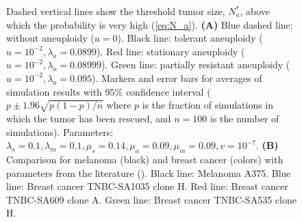 \documentclass[12pt]{extarticle}
\begin{document}
\begin{figure}
{Dashed vertical lines show the threshold tumor size, $N_a^*$, above which the probability is very high (\cref{eq:N_a}). 
\textbf{(A)} Blue dashed line: without aneuploidy ($u=0$). Black line: tolerant aneuploidy ($u=10^{-2}, \lambda_a=0.0899$). Red line: stationary aneuploidy ($u=10^{-2}, \lambda_a=0.08999$). Green line: partially resistant aneuploidy ($u=10^{-2}, \lambda_a=0.095$). Markers and error bars for averages of simulation results with $95\%$ confidence interval ($p\pm1.96\sqrt{p\left(1-p\right)/n}$ where $p$ is the fraction of simulations in which the tumor has been rescued, and $n=100$ is the number of simulations). Parameters: $\lambda_s=0.1,\lambda_m=0.1,\mu_s=0.14,\mu_a=0.09,\mu_m=0.09, v=10^{-7}$.
\textbf{(B)} Comparison for melanoma (black) and breast cancer (colors)  with parameters from the literature (). Black line: Melanoma A375. Blue line: Breast cancer TNBC-SA1035 clone H. Red line: Breast cancer TNBC-SA609 clone A. Green line: Breast cancer TNBC-SA535 clone H.
}
\label{rescue_prob}
\end{figure}
\end{document}
